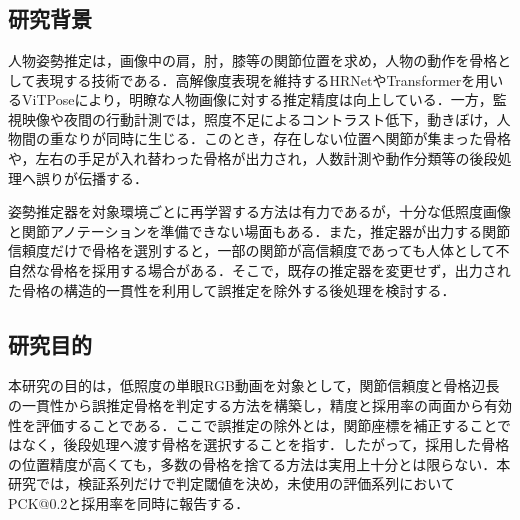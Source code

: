 \chapter{\UsamiIntroductionTitle}

\begin{center}
  \UsamiFictionalExampleNotice
\end{center}

\section{研究背景}

人物姿勢推定は，画像中の肩，肘，膝等の関節位置を求め，人物の動作を骨格として表現する技術である．高解像度表現を維持するHRNet\cite{sun2019hrnet}やTransformerを用いるViTPose\cite{xu2022vitpose}により，明瞭な人物画像に対する推定精度は向上している．一方，監視映像や夜間の行動計測では，照度不足によるコントラスト低下，動きぼけ，人物間の重なりが同時に生じる．このとき，存在しない位置へ関節が集まった骨格や，左右の手足が入れ替わった骨格が出力され，人数計測や動作分類等の後段処理へ誤りが伝播する．

姿勢推定器を対象環境ごとに再学習する方法は有力であるが，十分な低照度画像と関節アノテーションを準備できない場面もある．また，推定器が出力する関節信頼度だけで骨格を選別すると，一部の関節が高信頼度であっても人体として不自然な骨格を採用する場合がある．そこで，既存の推定器を変更せず，出力された骨格の構造的一貫性を利用して誤推定を除外する後処理を検討する．

\section{研究目的}

本研究の目的は，低照度の単眼RGB動画を対象として，関節信頼度と骨格辺長の一貫性から誤推定骨格を判定する方法を構築し，精度と採用率の両面から有効性を評価することである．ここで誤推定の除外とは，関節座標を補正することではなく，後段処理へ渡す骨格を選択することを指す．したがって，採用した骨格の位置精度が高くても，多数の骨格を捨てる方法は実用上十分とは限らない．本研究では，検証系列だけで判定閾値を決め，未使用の評価系列においてPCK@0.2と採用率を同時に報告する．

